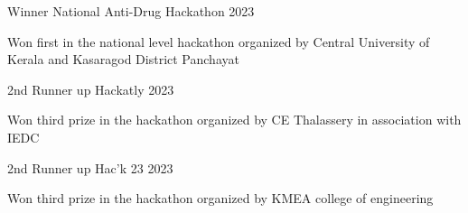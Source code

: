 
\begin{cventries}
  \cventry
    {Winner} %
    {National Anti-Drug Hackathon} %
    {}
    {2023} %
    {
      \begin{cvitems}
          \item {Won first in the national level hackathon organized by Central University of Kerala and Kasaragod District Panchayat}
      \end{cvitems}
    }
    
  \cventry
    {2nd Runner up}
    {Hackatly}
    {}
    {2023}
    {
      \begin{cvitems}
          \item {Won third prize in the hackathon organized by CE Thalassery in association with IEDC}
      \end{cvitems}
    }
    
  \cventry
    {2nd Runner up}
    {Hac'k 23}
    {}
    {2023}
    {
      \begin{cvitems}
          \item {Won third prize in the hackathon organized by KMEA college of engineering}
      \end{cvitems}
    }
    
\end{cventries}